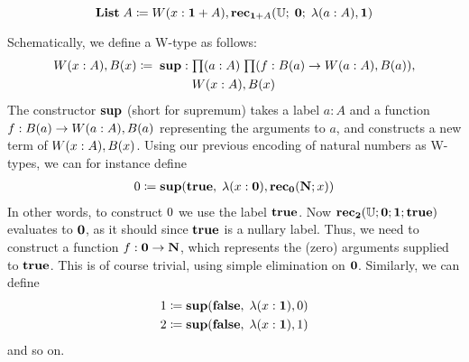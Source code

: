 \[ \mathbf{List} \; A \coloneqq W(x:\mathbf{1} + A), \mathbf{rec}_{\mathbf{1} + A}(\mathbb{U}; \; \mathbf{0}; \; \lambda{(a:A)}, \mathbf{1}) \]

Schematically, we define a W-type as follows:
\begin{align*}
  \wtype{x:A} B(x) \defeq \; \supp : & \; \prd{a:A}{f : B(a) \to \wtype{a:A} B(a)} \\ & \; \wtype{x:A} B(x)         
\end{align*}
The constructor $\mathbf{sup}$ (short for supremum) takes a label $a : A$ and a function $f : B(a) \to W(a:A), B(a)$ representing the arguments to $a$, and constructs a new term of $W(x:A), B(x)$. Using our previous encoding of natural numbers as W-types, we can for instance define
\begin{align*}
0 \coloneqq \mathbf{sup}(\mathbf{true}, \; \lambda(x : \mathbf{0}), \mathbf{rec}_\mathbf{0}(\mathbf{N};x))
\end{align*}
In other words, to construct $0$ we use the label $\mathbf{true}$. Now $\mathbf{rec}_\mathbf{2}(\mathbb{U};\mathbf{0};\mathbf{1}; \mathbf{true})$ evaluates to $\mathbf{0}$, as it should since $\mathbf{true}$ is a nullary label. Thus, we need to construct a function $f : \mathbf{0} \to \mathbf{N}$, which represents the (zero) arguments supplied to $\mathbf{true}$. This is of course trivial, using simple elimination on $\mathbf{0}$. Similarly, we can define
\begin{align*}
1 \coloneqq \mathbf{sup}(\mathbf{false}, \; \lambda(x : \mathbf{1}), 0) \\
2 \coloneqq \mathbf{sup}(\mathbf{false}, \; \lambda(x : \mathbf{1}), 1)
\end{align*}
and so on.

